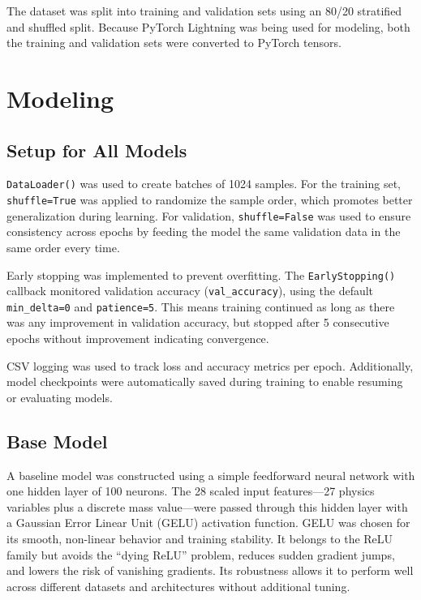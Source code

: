 \documentclass{article}      %
\begin{document}
The dataset was split into training and validation sets using an 80/20 stratified and shuffled split. Because PyTorch Lightning was being used for modeling, both the training and validation sets were converted to PyTorch tensors.

\section{Modeling}
\subsection{Setup for All Models}

\texttt{DataLoader()} was used to create batches of 1024 samples. For the training set, \texttt{shuffle=True} was applied to randomize the sample order, which promotes better generalization during learning. For validation, \texttt{shuffle=False} was used to ensure consistency across epochs by feeding the model the same validation data in the same order every time.

Early stopping was implemented to prevent overfitting. The \texttt{EarlyStopping()} callback monitored validation accuracy (\texttt{val\_accuracy}), using the default \texttt{min\_delta=0} and \texttt{patience=5}. This means training continued as long as there was any improvement in validation accuracy, but stopped after 5 consecutive epochs without improvement indicating convergence.

CSV logging was used to track loss and accuracy metrics per epoch. Additionally, model checkpoints were automatically saved during training to enable resuming or evaluating models.

\subsection{Base Model}

A baseline model was constructed using a simple feedforward neural network with one hidden layer of 100 neurons. The 28 scaled input features---27 physics variables plus a discrete mass value---were passed through this hidden layer with a Gaussian Error Linear Unit (GELU) activation function. GELU was chosen for its smooth, non-linear behavior and training stability. It belongs to the ReLU family but avoids the “dying ReLU” problem, reduces sudden gradient jumps, and lowers the risk of vanishing gradients. Its robustness allows it to perform well across different datasets and architectures without additional tuning.
\end{document}
